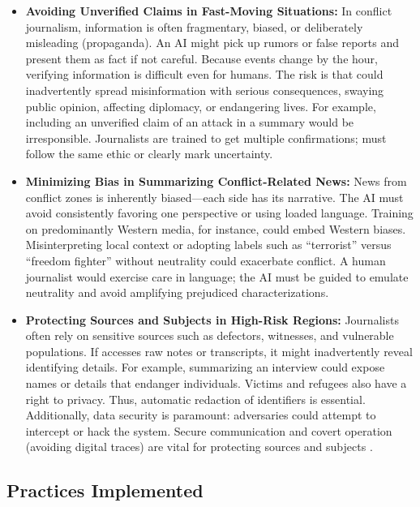 \begin{itemize}
    \item \textbf{Avoiding Unverified Claims in Fast-Moving Situations:} In conflict journalism, information is often fragmentary, biased, or deliberately misleading (propaganda). An AI might pick up rumors or false reports and present them as fact if not careful. Because events change by the hour, verifying information is difficult even for humans. The risk is that \ishtar{} could inadvertently spread misinformation with serious consequences, swaying public opinion, affecting diplomacy, or endangering lives. For example, including an unverified claim of an attack in a summary would be irresponsible. Journalists are trained to get multiple confirmations; \ishtar{} must follow the same ethic or clearly mark uncertainty.

    \item \textbf{Minimizing Bias in Summarizing Conflict-Related News:} News from conflict zones is inherently biased---each side has its narrative. The AI must avoid consistently favoring one perspective or using loaded language. Training on predominantly Western media, for instance, could embed Western biases. Misinterpreting local context or adopting labels such as ``terrorist'' versus ``freedom fighter'' without neutrality could exacerbate conflict. A human journalist would exercise care in language; the AI must be guided to emulate neutrality and avoid amplifying prejudiced characterizations.

    \item \textbf{Protecting Sources and Subjects in High-Risk Regions:} Journalists often rely on sensitive sources such as defectors, witnesses, and vulnerable populations. If \ishtar{} accesses raw notes or transcripts, it might inadvertently reveal identifying details. For example, summarizing an interview could expose names or details that endanger individuals. Victims and refugees also have a right to privacy. Thus, automatic redaction of identifiers is essential. Additionally, data security is paramount: adversaries could attempt to intercept or hack the system. Secure communication and covert operation (avoiding digital traces) are vital for protecting sources and subjects \cite{edpb2022}.
\end{itemize}

\subsection{Practices Implemented}

